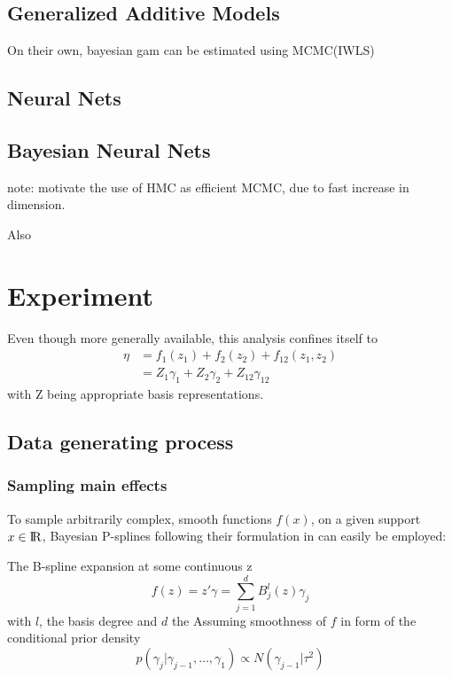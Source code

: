\documentclass[11pt]{article}
\begin{document}
        \subsection{Generalized Additive Models}
        On their own, bayesian gam can be estimated using MCMC(IWLS) \cite{}
        \subsection{Neural Nets}
        \subsection{Bayesian Neural Nets}
        note: motivate the use of HMC as efficient MCMC, due to fast increase in dimension.

        Also

    \clearpage
    \section{Experiment}
        Even though more generally available, this analysis confines itself to
        \begin{align}
            \eta &= f_1(z_1) + f_2(z_2) + f_{12}(z_1 , z_2) \\
                 &= Z_1 \gamma_1 + Z_2 \gamma_2 + Z_{12} \gamma_{12}
        \end{align}
        with Z being appropriate basis representations.
        \subsection{Data generating process}
            \subsubsection{Sampling main effects} \label{maineffect}
            To sample arbitrarily complex, smooth functions $f(x)$, on a given support $x \in {\rm I\!R}$, Bayesian P-splines following their formulation in \cite{fahrmeir2013regression} can easily be employed:

            The B-spline expansion at some continuous z
            \begin{equation} \label{Bspline}
                f(z) = z'\gamma = \sum_{j=1}^d B_j^l (z)\gamma_j
            \end{equation}
            with $l$, the basis degree and $d$ the
            Assuming smoothness of $f$ in form of the conditional prior density
            \begin{equation}
                p(\gamma_j|\gamma_{j-1}, \dots, \gamma_1) \propto N(\gamma_{j-1}|\tau^2)
            \end{equation}
\end{document}
